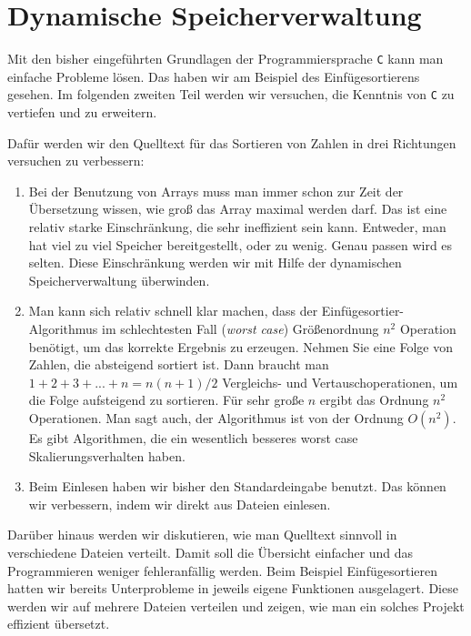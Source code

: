 \section{Dynamische Speicherverwaltung}

Mit den bisher eingeführten Grundlagen der Programmiersprache \texttt{C} kann man einfache Probleme lösen.
Das haben wir am Beispiel des Einfügesortierens gesehen.
Im folgenden zweiten Teil werden wir versuchen, die Kenntnis von \texttt{C} zu vertiefen und zu erweitern.

Dafür werden wir den Quelltext für das Sortieren von Zahlen in drei Richtungen versuchen zu verbessern:
\begin{enumerate}
\item Bei der Benutzung von Arrays muss man immer schon zur Zeit der Übersetzung wissen, wie groß das Array maximal werden darf.
  Das ist eine relativ starke Einschränkung, die sehr ineffizient sein kann.
  Entweder, man hat viel zu viel Speicher bereitgestellt, oder zu wenig.
  Genau passen wird es selten.
  Diese Einschränkung werden wir mit Hilfe der dynamischen Speicherverwaltung überwinden.

\item Man kann sich relativ schnell klar machen, dass der Einfügesortier-Algorithmus im schlechtesten Fall (\emph{worst case}) Größenordnung $n^2$ Operation benötigt, um das korrekte Ergebnis zu erzeugen.
  Nehmen Sie eine Folge von Zahlen, die absteigend sortiert ist.
  Dann braucht man $1 + 2 + 3 + ... + n = n(n+1)/2$ Vergleichs- und Vertauschoperationen, um die Folge aufsteigend zu sortieren.
  Für sehr große $n$ ergibt das Ordnung $n^2$ Operationen.
  Man sagt auch, der Algorithmus ist von der Ordnung $O(n^2)$.
  Es gibt Algorithmen, die ein wesentlich besseres worst case Skalierungsverhalten haben. 

\item Beim Einlesen haben wir bisher den Standardeingabe benutzt.
  Das können wir verbessern, indem wir direkt aus Dateien einlesen.
\end{enumerate}
Darüber hinaus werden wir diskutieren, wie man Quelltext sinnvoll in verschiedene Dateien verteilt.
Damit soll die Übersicht einfacher und das Programmieren weniger fehleranfällig werden.
Beim Beispiel Einfügesortieren hatten wir bereits Unterprobleme in jeweils eigene Funktionen ausgelagert.
Diese werden wir auf mehrere Dateien verteilen und zeigen, wie man ein solches Projekt effizient übersetzt.


